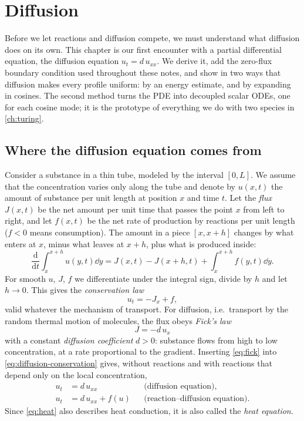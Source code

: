 \chapter{Diffusion}\label{ch:diffusion}

Before we let reactions and diffusion compete, we must understand what diffusion
does on its own. This chapter is our first encounter with a partial differential
equation, the diffusion equation $u_t=d\,u_{xx}$. We derive it, add the zero-flux
boundary condition used throughout these notes, and show in two ways that diffusion
makes every profile uniform: by an energy estimate, and by expanding in cosines. The
second method turns the PDE into decoupled scalar ODEs, one for each cosine mode; it
is the prototype of everything we do with two species in \cref{ch:turing}.

\section{Where the diffusion equation comes from}\label{sec:diffusion-derivation}

Consider a substance in a thin tube, modeled by the interval $[0,L]$. We assume that
the concentration varies only along the tube and denote by $u(x,t)$ the amount of
substance per unit length at position $x$ and time $t$. Let the \emph{flux}
$J(x,t)$ be the net amount per unit time that passes the point $x$
from left to right, and let $f(x,t)$ be the net rate of production by reactions per
unit length ($f<0$ means consumption). The amount in a piece $[x,x+h]$ changes by what
enters at $x$, minus what leaves at $x+h$, plus what is produced inside:
\begin{equation*}
  \frac{\mathrm d}{\mathrm dt}\int_x^{x+h}u(y,t)\dd y
  = J(x,t)-J(x+h,t)+\int_x^{x+h}f(y,t)\dd y .
\end{equation*}
For smooth $u$, $J$, $f$ we differentiate under the integral sign, divide by $h$ and
let $h\to0$. This gives the \emph{conservation law}
\begin{equation}\label{eq:diffusion-conservation}
  u_t = -J_x + f ,
\end{equation}
valid whatever the mechanism of transport. For diffusion, i.e.\ transport by the
random thermal motion of molecules, the flux obeys \emph{Fick's law}
\begin{equation}\label{eq:fick}
  J = -d\,u_x
\end{equation}
with a constant \emph{diffusion coefficient} $d>0$: substance flows from high to low
concentration, at a rate proportional to the gradient. Inserting \eqref{eq:fick} into
\eqref{eq:diffusion-conservation} gives, without reactions and with reactions that
depend only on the local concentration,
\begin{align}
  u_t &= d\,u_{xx} &&\text{(diffusion equation)},\label{eq:heat}\\
  u_t &= d\,u_{xx}+f(u) &&\text{(reaction--diffusion equation)}.\label{eq:diffusion-reaction}
\end{align}
Since \eqref{eq:heat} also describes heat conduction, it is also called the
\emph{heat equation}.

